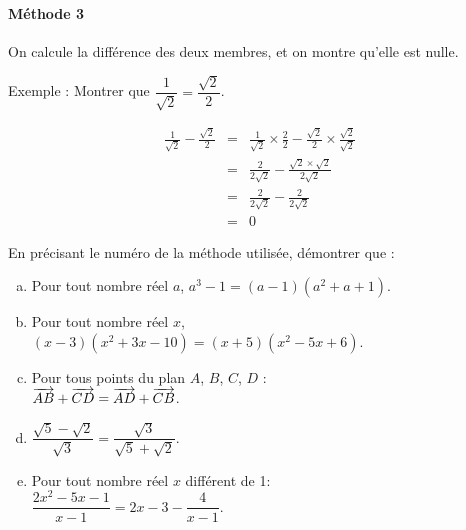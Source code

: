 \documentclass[11pt]{article}
\begin{document}
\begin{exercice}
  \paragraph{Méthode 3} On calcule la différence des deux membres, et on montre qu'elle est nulle.

  \begin{em}
    Exemple : Montrer que $\dfrac{1}{\sqrt 2}=\dfrac{\sqrt 2}{2}$.

    \begin{eqnarray*}
      \frac{1}{\sqrt 2}-\frac{\sqrt 2}{2} &=& \frac{1}{\sqrt 2}\times\frac{2}{2} - \frac{\sqrt 2}{2}\times\frac{\sqrt 2}{\sqrt 2}\\
                                          &=& \frac{2}{2\sqrt 2}-\frac{\sqrt 2\times\sqrt 2}{2\sqrt2}\\
                                          &=& \frac{2}{2\sqrt 2}-\frac{2}{2\sqrt 2}\\
                                          &=& 0
    \end{eqnarray*}
  \end{em}

  En précisant le numéro de la méthode utilisée, démontrer que :
  \begin{enumerate}[(a)]
    \item Pour tout nombre réel $a$, $a^3-1=(a-1)(a^2+a+1)$.
    \item Pour tout nombre réel $x$, $(x-3)(x^2+3x-10)=(x+5)(x^2-5x+6)$.
    \item Pour tous points du plan $A$, $B$, $C$, $D$ :\\ $\overrightarrow{AB}+\overrightarrow{CD}=\overrightarrow{AD}+\overrightarrow{CB}$.
    \item $\dfrac{\sqrt5-\sqrt2}{\sqrt3}=\dfrac{\sqrt3}{\sqrt5+\sqrt2}$.
    \item Pour tout nombre réel $x$ différent de 1:\\ $\dfrac{2x^2-5x-1}{x-1}=2x-3-\dfrac{4}{x-1}$.
  \end{enumerate}
\end{exercice}
\end{document}
